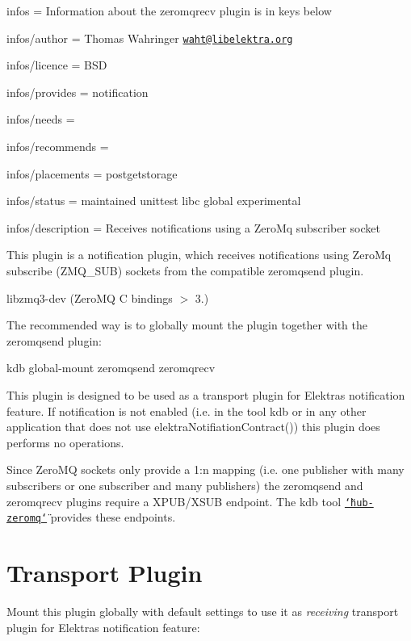 
\begin{DoxyItemize}
\item infos = Information about the zeromqrecv plugin is in keys below
\item infos/author = Thomas Wahringer \href{mailto:waht@libelektra.org}{\tt waht@libelektra.\+org}
\item infos/licence = B\+SD
\item infos/provides = notification
\item infos/needs =
\item infos/recommends =
\item infos/placements = postgetstorage
\item infos/status = maintained unittest libc global experimental
\item infos/description = Receives notifications using a Zero\+Mq subscriber socket
\end{DoxyItemize}

This plugin is a notification plugin, which receives notifications using Zero\+Mq subscribe ({\ttfamily Z\+M\+Q\+\_\+\+S\+UB}) sockets from the compatible zeromqsend plugin.


\begin{DoxyItemize}
\item {\ttfamily libzmq3-\/dev} (Zero\+MQ C bindings $>$ 3.)
\end{DoxyItemize}

The recommended way is to globally mount the plugin together with the zeromqsend plugin\+: \begin{DoxyVerb}kdb global-mount zeromqsend zeromqrecv
\end{DoxyVerb}


This plugin is designed to be used as a transport plugin for Elektra\textquotesingle{}s notification feature. If notification is not enabled (i.\+e. in the tool {\ttfamily kdb} or in any other application that does not use {\ttfamily elektra\+Notifiation\+Contract()}) this plugin does performs no operations.

Since Zero\+MQ sockets only provide a 1\+:n mapping (i.\+e. one publisher with many subscribers or one subscriber and many publishers) the {\ttfamily zeromqsend} and {\ttfamily zeromqrecv} plugins require a X\+P\+U\+B/\+X\+S\+UB endpoint. The kdb tool \href{https://www.libelektra.org/tools/hub-zeromq}{\tt \char`\"{}hub-\/zeromq\char`\"{}} provides these endpoints.\hypertarget{autotoc_md900_autotoc_md903}{}\section{Transport Plugin}\label{autotoc_md900_autotoc_md903}
Mount this plugin globally with default settings to use it as {\itshape receiving} transport plugin for Elektra\textquotesingle{}s notification feature\+:

